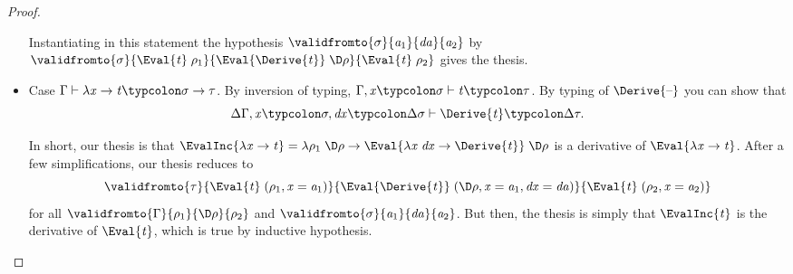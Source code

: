 \begin{proof}
\begin{itemize}
    Instantiating in this statement the hypothesis \ensuremath{\validfromto{\sigma}{\Varid{a}_{1}}{\Varid{da}}{\Varid{a}_{2}}} by
    \ensuremath{\validfromto{\sigma}{\Eval{\Varid{t}}\;\rho_{1}}{\Eval{\Derive{\Varid{t}}}\;\D\rho}{\Eval{\Varid{t}}\;\rho_{2}}} gives the
    thesis.

  \item Case \ensuremath{\Gamma\vdash\lambda \Varid{x}\to \Varid{t}\typcolon\sigma\to \tau}. By inversion of typing,
    \ensuremath{\Gamma,\Varid{x}\typcolon\sigma\vdash\Varid{t}\typcolon\tau}.
    By typing of \ensuremath{\Derive{\text{\textendash}}} you can show that
    \[\ensuremath{\Delta \Gamma,\Varid{x}\typcolon\sigma,\Varid{dx}\typcolon\Delta \sigma\vdash\Derive{\Varid{t}}\typcolon\Delta \tau}.\]


    In short, our thesis is that \ensuremath{\EvalInc{\lambda \Varid{x}\to \Varid{t}}\mathrel{=}\lambda \rho_{1}\;\D\rho\to \Eval{\lambda \Varid{x}\;\Varid{dx}\to \Derive{\Varid{t}}}\;\D\rho} is a
    derivative of \ensuremath{\Eval{\lambda \Varid{x}\to \Varid{t}}}. After a few simplifications, our thesis reduces to
    \[\ensuremath{\validfromto{\tau}{\Eval{\Varid{t}}\;(\rho_{1},\Varid{x}\mathrel{=}\Varid{a}_{1})}{\Eval{\Derive{\Varid{t}}}\;(\D\rho,\Varid{x}\mathrel{=}\Varid{a}_{1},\Varid{dx}\mathrel{=}\Varid{da})}{\Eval{\Varid{t}}\;(\rho_{2},\Varid{x}\mathrel{=}\Varid{a}_{2})}}\]
    for all \ensuremath{\validfromto{\Gamma}{\rho_{1}}{\D\rho}{\rho_{2}}} and \ensuremath{\validfromto{\sigma}{\Varid{a}_{1}}{\Varid{da}}{\Varid{a}_{2}}}.
    But then, the thesis is simply that \ensuremath{\EvalInc{\Varid{t}}} is the derivative of \ensuremath{\Eval{\Varid{t}}}, which is true by inductive hypothesis.



\end{itemize}
\end{proof}
